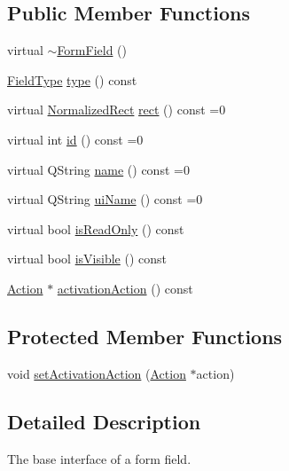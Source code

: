 \subsection*{Public Member Functions}
\begin{DoxyCompactItemize}
\item 
virtual \hyperlink{classOkular_1_1FormField_ae415bd326ee72a16f11b4cdef8c7b69d}{$\sim$\+Form\+Field} ()
\item 
\hyperlink{classOkular_1_1FormField_a46e9c2bd0942dfe55408c8c1aa5363cf}{Field\+Type} \hyperlink{classOkular_1_1FormField_a35d03786e3e37e783c43f1206c5a7842}{type} () const 
\item 
virtual \hyperlink{classOkular_1_1NormalizedRect}{Normalized\+Rect} \hyperlink{classOkular_1_1FormField_a76014a9315921056764c72dd17b81339}{rect} () const =0
\item 
virtual int \hyperlink{classOkular_1_1FormField_a88ae3d04b4fbe5fd0fedeb068b3d5071}{id} () const =0
\item 
virtual Q\+String \hyperlink{classOkular_1_1FormField_a8eed821c6f1b957610fd275930c8f7cf}{name} () const =0
\item 
virtual Q\+String \hyperlink{classOkular_1_1FormField_a32a3eed7310ff961cc2d748135d4173b}{ui\+Name} () const =0
\item 
virtual bool \hyperlink{classOkular_1_1FormField_ad1636c715682959442f528c72a2f4c0a}{is\+Read\+Only} () const 
\item 
virtual bool \hyperlink{classOkular_1_1FormField_aee63f77f88a7f8359d9a53de3d07ebe0}{is\+Visible} () const 
\item 
\hyperlink{classOkular_1_1Action}{Action} $\ast$ \hyperlink{classOkular_1_1FormField_a97f9f6b3bdfb5043dda743e6d4bc72e5}{activation\+Action} () const 
\end{DoxyCompactItemize}
\subsection*{Protected Member Functions}
\begin{DoxyCompactItemize}
\item 
void \hyperlink{classOkular_1_1FormField_a39a5161a282d40bc88a1633e93655c50}{set\+Activation\+Action} (\hyperlink{classOkular_1_1Action}{Action} $\ast$action)
\end{DoxyCompactItemize}


\subsection{Detailed Description}
The base interface of a form field. 

